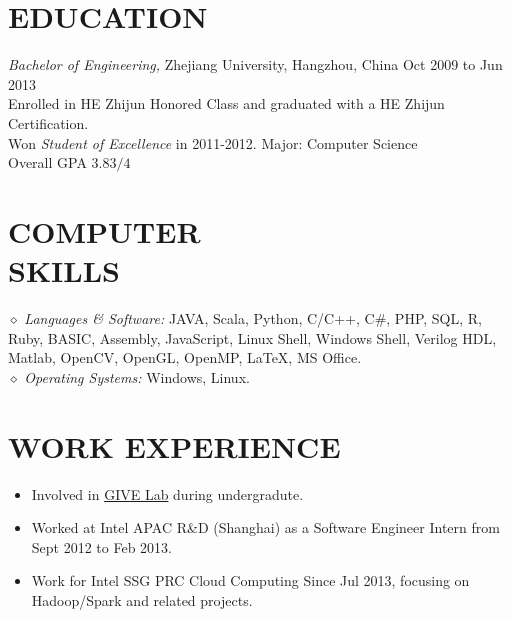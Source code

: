 \documentclass[line,margin]{res}
\begin{document}
\address{Cellphone:\sl 15216861267}
\address{E-mail:\sl me@daoyuan.wang}


\begin{resume}


\section{EDUCATION} {\sl Bachelor of Engineering,} Zhejiang University, Hangzhou, China \hfill Oct 2009 to Jun 2013\\
                Enrolled in HE Zhijun Honored Class and graduated with a HE Zhijun Certification.\\
                Won {\sl Student of Excellence} in 2011-2012.
                Major: Computer Science \\
                Overall GPA $3.83/4$

\section{COMPUTER \\ SKILLS} {$\diamond$ \sl Languages \& Software:} JAVA, Scala, Python, C/C++, C\#, PHP, SQL, R, Ruby, BASIC, Assembly, JavaScript, Linux Shell, Windows Shell, Verilog HDL, Matlab, OpenCV, OpenGL, OpenMP, \LaTeX, MS Office. \\
                {$\diamond$ \sl Operating Systems:} Windows, Linux.
                
\section{WORK EXPERIENCE}
            \begin{itemize}
            \item Involved in \href{http://give.zju.edu.cn/en/portal/index.html}{GIVE Lab} during undergradute.
            \item Worked at Intel APAC R\&D (Shanghai) as a Software Engineer Intern from Sept 2012 to Feb 2013.
            \item Work for Intel SSG PRC Cloud Computing Since Jul 2013, focusing on Hadoop/Spark and related projects.
            \end{itemize}


\end{resume}
\end{document}
